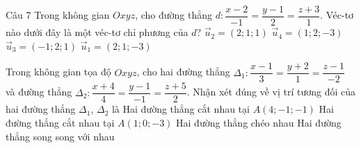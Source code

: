 \begin{ex}Câu 7%
Trong không gian $Oxyz$, cho đường thẳng $d \colon \dfrac{x-2}{-1}=\dfrac{y-1}{2}=\dfrac{z+3}{1}$. Véc-tơ nào dưới đây là một véc-tơ chỉ phương của $d$?
\choice
{$\overrightarrow{u}_2=(2;1;1)$}
{$\overrightarrow{u}_4=(1;2;-3)$}
{\True $\overrightarrow{u}_3=(-1;2;1)$}
{$\overrightarrow{u}_1=(2;1;-3)$}
\end{ex}

\begin{ex}%
Trong không gian tọa độ $Oxyz$, cho hai đường thẳng $\Delta_1\colon \dfrac{x-1}{3}=\dfrac{y+2}{1}=\dfrac{z-1}{-2}$ và đường thẳng $\Delta_2\colon \dfrac{x+4}{4}=\dfrac{y-1}{-1}=\dfrac{z+5}{2}$. Nhận xét đúng về vị trí tương đối của hai đường thẳng $\Delta_1$, $\Delta_2$ là
\choice
{\True Hai đường thẳng cắt nhau tại $A(4;-1;-1)$}
{Hai đường thẳng cắt nhau tại $A(1;0;-3)$}
{Hai đường thẳng chéo nhau}
{Hai đường thẳng song song với nhau}
\end{ex}

